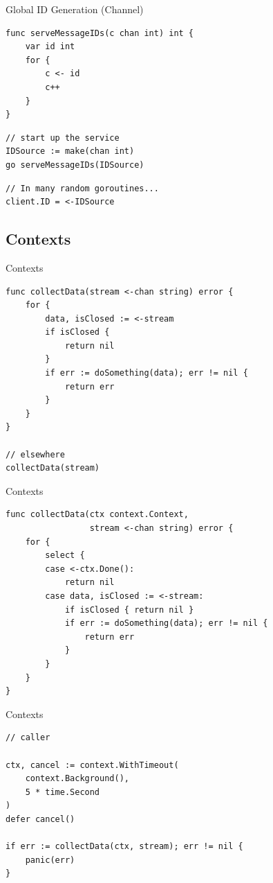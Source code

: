 \documentclass[pdf]{beamer}
\begin{document}
\begin{frame}[fragile]{Global ID Generation (Channel)}
\begin{lstlisting}
func serveMessageIDs(c chan int) int {
    var id int
    for {
        c <- id
        c++
    }
}
\end{lstlisting}
\pause
\begin{lstlisting}
// start up the service
IDSource := make(chan int)
go serveMessageIDs(IDSource)
\end{lstlisting}
\pause
\begin{lstlisting}
// In many random goroutines...
client.ID = <-IDSource
\end{lstlisting}
\end{frame}

\subsection{Contexts}
\begin{frame}[fragile]{Contexts}
\begin{lstlisting}
func collectData(stream <-chan string) error {
    for {
        data, isClosed := <-stream
        if isClosed {
            return nil
        }
        if err := doSomething(data); err != nil {
            return err
        }
    }
}

// elsewhere
collectData(stream)
\end{lstlisting}
\end{frame}

\begin{frame}[fragile]{Contexts}
\begin{lstlisting}
func collectData(ctx context.Context, 
                 stream <-chan string) error {
    for {
        select {
        case <-ctx.Done():
            return nil
        case data, isClosed := <-stream:
            if isClosed { return nil }
            if err := doSomething(data); err != nil {
                return err
            }
        }
    }
}
\end{lstlisting}
\end{frame}

\begin{frame}[fragile]{Contexts}
\begin{lstlisting}
// caller

ctx, cancel := context.WithTimeout(
    context.Background(), 
    5 * time.Second
)
defer cancel()

if err := collectData(ctx, stream); err != nil {
    panic(err)
}
\end{lstlisting}
\end{frame}
\end{document}

